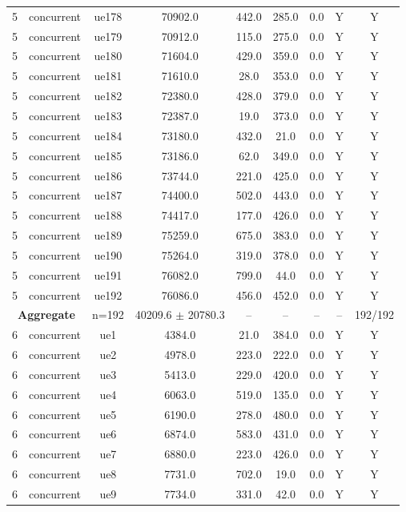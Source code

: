 \begin{table}[ht]
\begin{tabular}{|c|c|c|c|c|c|c|c|c|}
5 & concurrent & ue178 & 70902.0 & 442.0 & 285.0 & 0.0 & Y & Y \\
5 & concurrent & ue179 & 70912.0 & 115.0 & 275.0 & 0.0 & Y & Y \\
5 & concurrent & ue180 & 71604.0 & 429.0 & 359.0 & 0.0 & Y & Y \\
5 & concurrent & ue181 & 71610.0 & 28.0 & 353.0 & 0.0 & Y & Y \\
5 & concurrent & ue182 & 72380.0 & 428.0 & 379.0 & 0.0 & Y & Y \\
5 & concurrent & ue183 & 72387.0 & 19.0 & 373.0 & 0.0 & Y & Y \\
5 & concurrent & ue184 & 73180.0 & 432.0 & 21.0 & 0.0 & Y & Y \\
5 & concurrent & ue185 & 73186.0 & 62.0 & 349.0 & 0.0 & Y & Y \\
5 & concurrent & ue186 & 73744.0 & 221.0 & 425.0 & 0.0 & Y & Y \\
5 & concurrent & ue187 & 74400.0 & 502.0 & 443.0 & 0.0 & Y & Y \\
5 & concurrent & ue188 & 74417.0 & 177.0 & 426.0 & 0.0 & Y & Y \\
5 & concurrent & ue189 & 75259.0 & 675.0 & 383.0 & 0.0 & Y & Y \\
5 & concurrent & ue190 & 75264.0 & 319.0 & 378.0 & 0.0 & Y & Y \\
5 & concurrent & ue191 & 76082.0 & 799.0 & 44.0 & 0.0 & Y & Y \\
5 & concurrent & ue192 & 76086.0 & 456.0 & 452.0 & 0.0 & Y & Y \\
\multicolumn{2}{|c|}{\textbf{Aggregate}} & n=192 & 40209.6 $\pm$ 20780.3 & -- & -- & -- & -- & 192/192 \\
\hline
6 & concurrent & ue1 & 4384.0 & 21.0 & 384.0 & 0.0 & Y & Y \\
6 & concurrent & ue2 & 4978.0 & 223.0 & 222.0 & 0.0 & Y & Y \\
6 & concurrent & ue3 & 5413.0 & 229.0 & 420.0 & 0.0 & Y & Y \\
6 & concurrent & ue4 & 6063.0 & 519.0 & 135.0 & 0.0 & Y & Y \\
6 & concurrent & ue5 & 6190.0 & 278.0 & 480.0 & 0.0 & Y & Y \\
6 & concurrent & ue6 & 6874.0 & 583.0 & 431.0 & 0.0 & Y & Y \\
6 & concurrent & ue7 & 6880.0 & 223.0 & 426.0 & 0.0 & Y & Y \\
6 & concurrent & ue8 & 7731.0 & 702.0 & 19.0 & 0.0 & Y & Y \\
6 & concurrent & ue9 & 7734.0 & 331.0 & 42.0 & 0.0 & Y & Y \\

\end{tabular}
\end{table}
